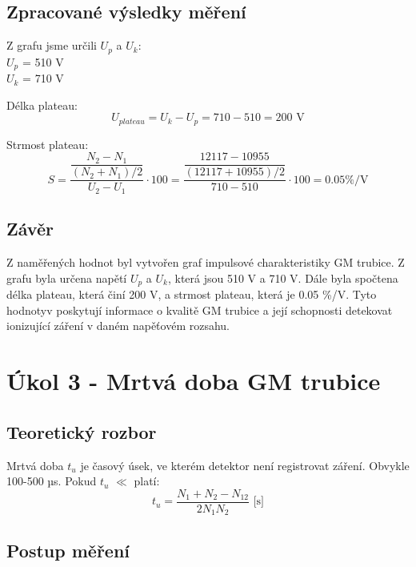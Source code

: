 \documentclass{protokol}
\begin{document}
    \subsection{Zpracované výsledky měření}

    Z grafu jsme určili $U_p$ a $U_k$:
    \\
    $U_p$ = 510 V\\
    $U_k$ = 710 V

    Délka plateau:
    \begin{equation}
        U_{plateau} = U_k - U_p = 710 - 510 = 200 \text{ V}
    \end{equation}

    Strmost plateau:
    \begin{equation}   
        S =  \dfrac{\dfrac{N_2-N_1}{(N_2+N_1)/2}}{U_2-U_1} \cdot 100 = \dfrac{\dfrac{12117-10955}{(12117+10955)/2}}{710-510} \cdot 100 = 0.05  \% / \text{V}
    \end{equation}
    
    \subsection{Závěr}
    Z naměřených hodnot byl vytvořen graf impulsové charakteristiky GM trubice. Z grafu byla určena napětí $U_p$ a $U_k$, která jsou 510 V a 710 V. Dále byla spočtena délka plateau, která činí 200 V, a strmost plateau, která je 0.05 \%/V. Tyto hodnotyv poskytují informace o kvalitě GM trubice a její schopnosti detekovat ionizující záření v daném napěťovém rozsahu.

\pagebreak

\section{Úkol 3 - Mrtvá doba GM trubice}
    \subsection{Teoretický rozbor}

    Mrtvá doba $t_u$ je časový úsek, ve kterém detektor není registrovat záření. Obvykle 100-500 µs. Pokud $t_u$ $\ll$  platí:
    \begin{equation}   
        t_u =  \dfrac{N_1+N_2-N_{12}}{2N_1N_2}  \text{     [s]}
    \end{equation}

    \subsection{Postup měření}
\end{document}
